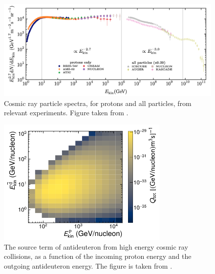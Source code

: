 \begin{figure}
    \centering
    \includegraphics[width=\textwidth]{figures/ThomasP_cosmic_ray_spectra.png}

    \caption{Cosmic ray particle spectra, for protons and all particles, from relevant experiments. Figure taken from \cite{ThomasThesis}. }
    \label{fig:CR_spectra_Thomas}
\end{figure}
\begin{figure}[hbtp]
    \centering
    \includegraphics[width=0.75\textwidth]{figures/dbar_2dplot_production.png}
    \caption{The source term of antideuteron from high energy cosmic ray collisions, as a function of the incoming proton energy and the outgoing antideuteron energy. The figure is taken from \cite{dbar paper}.}
    \label{fig:dbar_2d_source_CR}
\end{figure}



